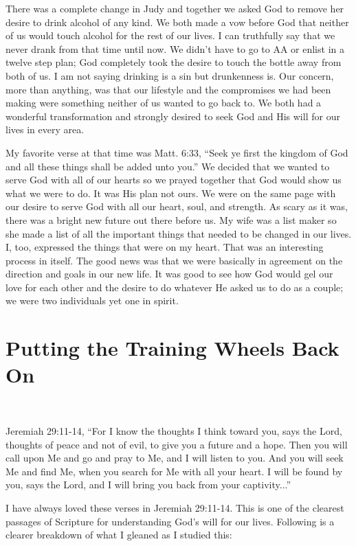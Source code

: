 \documentclass[oneside]{book}
\begin{document}
There was a complete change in Judy and together we asked God to remove her desire to drink alcohol of any kind. We both made a vow before God that neither of us would touch alcohol for the rest of our lives. I can truthfully say that we never drank from that time until now. We didn't have to go to AA or enlist in a twelve step plan; God completely took the desire to touch the bottle away from both of us. I am not saying drinking is a sin but drunkenness is. Our concern, more than anything, was that our lifestyle and the compromises we had been making were something neither of us wanted to go back to. We both had a wonderful transformation and strongly desired to seek God and His will for our lives in every area.

My favorite verse at that time was Matt. 6:33, “Seek ye first the kingdom of God and all these things shall be added unto you.” We decided that we wanted to serve God with all of our hearts so we prayed together that God would show us what we were to do. It was His plan not ours. We were on the same page with our desire to serve God with all our heart, soul, and strength. As scary as it was, there was a bright new future out there before us. My wife was a list maker so she made a list of all the important things that needed to be changed in our lives. I, too, expressed the things that were on my heart. That was an interesting process in itself. The good news was that we were basically in agreement on the direction and goals in our new life. It was good to see how God would gel our love for each other and the desire to do whatever He asked us to do as a couple; we were two individuals yet one in spirit.


\section{Putting the Training Wheels Back On}
\

Jeremiah 29:11-14, “For I know the thoughts I think toward you, says the Lord, thoughts of peace and not of evil, to give you a future and a hope. Then you will call upon Me and go and pray to Me, and I will listen to you. And you will seek Me and find Me, when you search for Me with all your heart. I will be found by you, says the Lord, and I will bring you back from your captivity...”

I have always loved these verses in Jeremiah 29:11-14. This is one of the clearest passages of Scripture for understanding God's will for our lives. Following is a clearer breakdown of what I gleaned as I studied this:
	
\end{document}
